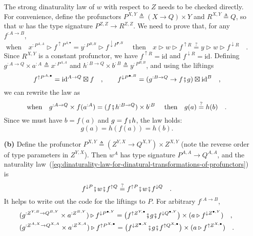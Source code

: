 The strong dinaturality law of $w$ with respect to $Z$ needs to
be checked directly. For convenience, define the profunctors $P^{X,Y}\triangleq(X\rightarrow Q)\times Y$
and $R^{X,Y}\triangleq Q$, so that $w$ has the type signature $P^{Z,Z}\rightarrow R^{Z,Z}$.
We need to prove that, for any $f^{:A\rightarrow B}$,
\[
\text{when}\quad x^{:P^{A,A}}\triangleright f^{\uparrow P^{A,\bullet}}=y^{:P^{B,B}}\triangleright f^{\downarrow P^{\bullet,B}}\quad\text{ then}\quad x\triangleright w\triangleright f^{\uparrow R}\overset{?}{=}y\triangleright w\triangleright f^{\downarrow R}\quad.
\]
Since $R^{X,Y}$ is a constant profunctor, we have $f^{\uparrow R}=\text{id}$
and $f^{\downarrow R}=\text{id}$. Defining $g^{:A\rightarrow Q}\times a^{:A}\triangleq x^{:P^{A,A}}$
and $h^{:B\rightarrow Q}\times b^{:B}\triangleq y^{:P^{B,B}}$, and
using the liftings 
\[
f^{\uparrow P^{A,\bullet}}=\text{id}^{A\rightarrow Q}\boxtimes f\quad,\quad\quad f^{\downarrow P^{\bullet,B}}=(g^{:B\rightarrow Q}\rightarrow f\bef g)\boxtimes\text{id}^{B}\quad,
\]
we can rewrite the law as
\[
\text{when}\quad g^{:A\rightarrow Q}\times f(a^{:A})=(f\bef h^{:B\rightarrow Q})\times b^{:B}\quad\text{ then}\quad g(a)\overset{?}{=}h(b)\quad.
\]
Since we must have $b=f(a)$ and $g=f\bef h$, the law holds:
\[
g(a)=h(f(a))=h(b).
\]

\textbf{(b)} Define the profunctor $P^{X,Y}\triangleq(Z^{Y,X}\rightarrow Q^{X,Y})\times Z^{X,Y}$
(note the reverse order of type parameters in $Z^{Y,X}$). Then $w^{A}$
has type signature $P^{A,A}\rightarrow Q^{A,A}$, and the naturality
law~(\ref{eq:dinaturality-law-for-dinatural-transformations-of-profunctors})
is
\[
f^{\downarrow P}\bef w\bef f^{\uparrow Q}\overset{?}{=}f^{\uparrow P}\bef w\bef f^{\downarrow Q}\quad.
\]
It helps to write out the code for the liftings to $P$. For arbitrary
$f^{:A\rightarrow B}$,
\begin{align*}
 & (g^{:Z^{Y,B}\rightarrow Q^{B,Y}}\times a^{:Z^{B,Y}})\triangleright f^{\downarrow P^{\bullet,Y}}=\big(f^{\uparrow Z^{Y,\bullet}}\bef g\bef f^{\downarrow Q^{\bullet,Y}}\big)\times(a\triangleright f^{\downarrow Z^{\bullet,Y}})\quad,\\
 & (g^{:Z^{A,X}\rightarrow Q^{X,A}}\times a^{:Z^{X,A}})\triangleright f^{\uparrow P^{X,\bullet}}=\big(f^{\downarrow Z^{\bullet,X}}\bef g\bef f^{\uparrow Q^{X,\bullet}}\big)\times(a\triangleright f^{\uparrow Z^{X,\bullet}})\quad.
\end{align*}

